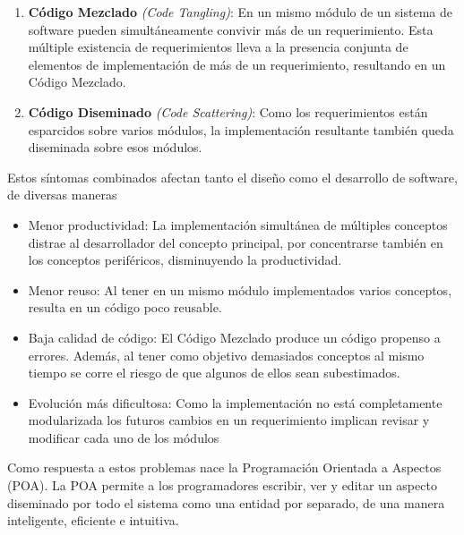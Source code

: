 \begin {enumerate}

	\item {\bf Código Mezclado } \emph{(Code Tangling)}:
	En un mismo módulo de un sistema de software pueden simultáneamente convivir más
	de un requerimiento. Esta múltiple existencia de requerimientos lleva a la
	presencia conjunta de elementos de implementación de más de un
	requerimiento, resultando en un Código Mezclado.\cite{mislevy2008dpa}
	
	\item {\bf Código Diseminado} \emph{(Code Scattering)}:
	Como los requerimientos están esparcidos sobre varios módulos, la implementación
	resultante también queda diseminada sobre esos módulos.\cite{mislevy2008dpa}
 
\end{enumerate}

Estos síntomas combinados afectan tanto el diseño como el desarrollo de
software, de diversas maneras

\begin{itemize}
  
	\item Menor productividad: La implementación simultánea de múltiples
	conceptos distrae al desarrollador del concepto principal, por
	concentrarse también en los conceptos periféricos, disminuyendo la
	productividad.
	\cite{Fradet}
  
  \item Menor reuso: Al tener en un mismo módulo implementados varios
	conceptos, resulta en un código poco reusable.
	
	\item Baja calidad de código: El Código Mezclado produce un código
	propenso a errores. Además, al tener como objetivo demasiados
	conceptos al mismo tiempo se corre el riesgo de que algunos de ellos
	sean subestimados.\cite{Fradet}
	
	\item Evolución más dificultosa: Como la implementación no está
	completamente modularizada los futuros cambios en un
	requerimiento implican revisar y modificar cada uno de los módulos
  
\end{itemize}

Como respuesta a estos problemas nace la Programación Orientada a Aspectos
(POA). La POA permite a los programadores escribir, ver y editar un aspecto
diseminado por todo el sistema como una entidad por separado, de una manera
inteligente, eficiente e intuitiva.\\ \\

